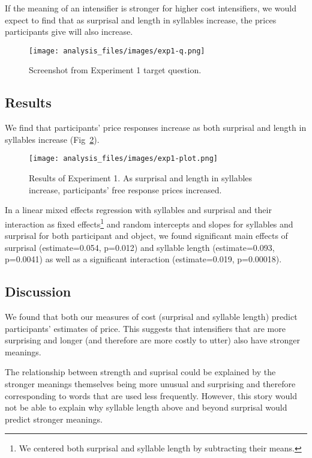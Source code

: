 \documentclass[10pt,letterpaper]{article}
\begin{document}
If the meaning of an intensifier is stronger for higher cost intensifiers, we would expect to find that as surprisal and length in syllables increase, the prices participants give will also increase.

\begin{figure}[ht]
\begin{center}
\texttt{[image: analysis\_files/images/exp1-q.png]}
\end{center}
\caption{Screenshot from Experiment 1 target question.} 
\label{exp1-q}
\end{figure}

\subsection{Results}

We find that participants' price responses increase as both surprisal and length in syllables increase (Fig~\ref{exp1-plot}).

\begin{figure}[ht]
\begin{center}
\texttt{[image: analysis\_files/images/exp1-plot.png]}
\end{center}
\caption{Results of Experiment 1. As surprisal and length in syllables increase, participants' free response prices increased.} 
\label{exp1-plot}
\end{figure}

In a linear mixed effects regression with syllables and surprisal and their interaction as fixed effects\footnote{We centered both surprisal and syllable length by subtracting their means.} and random intercepts and slopes for syllables and surprisal for both participant and object, we found significant main effects of surprisal (estimate=0.054, p=0.012) and syllable length  (estimate=0.093, p=0.0041) as well as a significant interaction (estimate=0.019, p=0.00018).

\subsection{Discussion}

We found that both our measures of cost (surprisal and syllable length) predict participants' estimates of price.
This suggests that intensifiers that are more surprising and longer (and therefore are more costly to utter) also have stronger meanings.

The relationship between strength and suprisal could be explained by the stronger meanings themselves being more unusual and surprising and therefore corresponding to words that are used less frequently.
However, this story would not be able to explain why syllable length above and beyond surprisal would predict stronger meanings.
\end{document}

